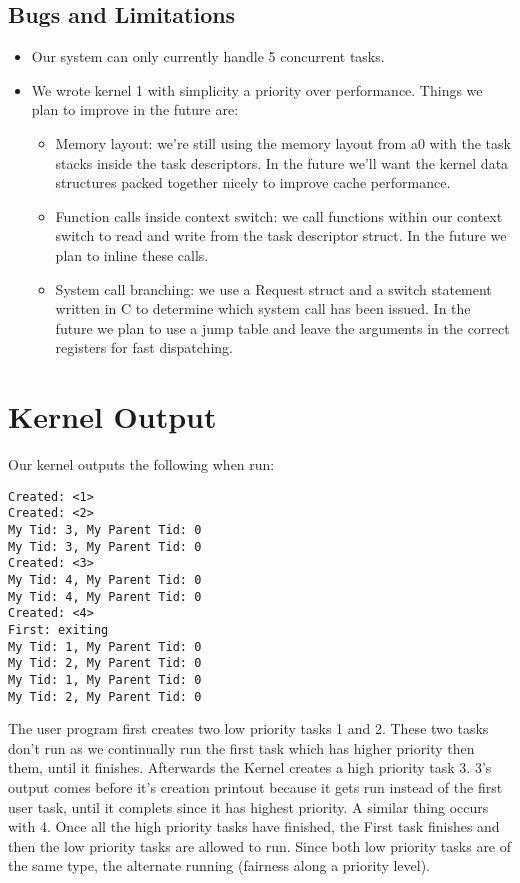 \documentclass{article}
\begin{document}
\subsection{Bugs and Limitations}
\begin{itemize}
  \item Our system can only currently handle 5 concurrent tasks.
  \item We wrote kernel 1 with simplicity a priority over performance. Things we plan to improve in the future are:
\begin{itemize}
\item Memory layout: we're still using the memory layout from a0 with the task stacks inside the task descriptors. In the future we'll want the kernel data structures packed together nicely to improve cache performance.
\item Function calls inside context switch: we call functions within our context switch to read and write from the task descriptor struct. In the future we plan to inline these calls.
\item System call branching: we use a Request struct and a switch statement written in C to determine which system call has been issued. In the future we plan to use a jump table and leave the arguments in the correct registers for fast dispatching.
\end{itemize}
\end{itemize}

\section{Kernel Output}

Our kernel outputs the following when run:
\begin{verbatim}
Created: <1>
Created: <2>
My Tid: 3, My Parent Tid: 0
My Tid: 3, My Parent Tid: 0
Created: <3>
My Tid: 4, My Parent Tid: 0
My Tid: 4, My Parent Tid: 0
Created: <4>
First: exiting
My Tid: 1, My Parent Tid: 0
My Tid: 2, My Parent Tid: 0
My Tid: 1, My Parent Tid: 0
My Tid: 2, My Parent Tid: 0
\end{verbatim}

The user program first creates two low priority tasks 1 and 2. These two tasks don't run as we continually run the first task which has higher priority then them, until it finishes. Afterwards the Kernel creates a high priority task 3. 3's output comes before it's creation printout because it gets run instead of the first user task, until it complets since it has highest priority. A similar thing occurs with 4. Once all the high priority tasks have finished, the First task finishes and then the low priority tasks are allowed to run. Since both low priority tasks are of the same type, the alternate running (fairness along a priority level).
\end{document}
